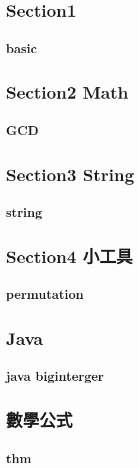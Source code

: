 \section{Section1}
    \subsection{basic}
        
        
\section{Section2 Math}
    \subsection{GCD}
            

\section{Section3 String}
    \subsection{string}
        
\section{Section4 小工具}
    \subsection{permutation}
        

\section{Java}
    \subsection{java biginterger}
        

\section{數學公式}
    \subsection{thm}
        
        
